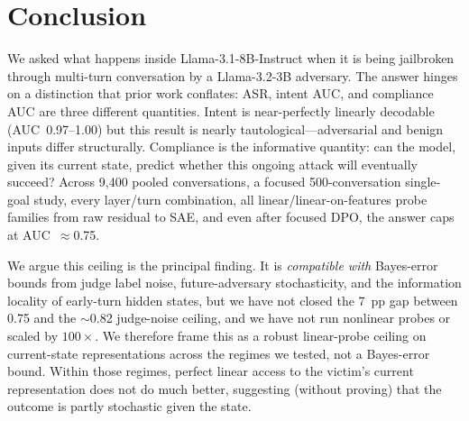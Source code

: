\documentclass[11pt]{article}
\begin{document}
\section{Conclusion}

We asked what happens inside Llama-3.1-8B-Instruct when it is being jailbroken through multi-turn conversation by a Llama-3.2-3B adversary.
The answer hinges on a distinction that prior work conflates: ASR, intent AUC, and compliance AUC are three different quantities.
Intent is near-perfectly linearly decodable (AUC~0.97--1.00) but this result is nearly tautological---adversarial and benign inputs differ structurally.
Compliance is the informative quantity: can the model, given its current state, predict whether this ongoing attack will eventually succeed?
Across 9{,}400 pooled conversations, a focused 500-conversation single-goal study, every layer/turn combination, all linear/linear-on-features probe families from raw residual to SAE, and even after focused DPO, the answer caps at AUC~$\approx$0.75.

We argue this ceiling is the principal finding.
It is \emph{compatible with} Bayes-error bounds from judge label noise, future-adversary stochasticity, and the information locality of early-turn hidden states, but we have not closed the 7~pp gap between 0.75 and the $\sim$0.82 judge-noise ceiling, and we have not run nonlinear probes or scaled by $100\times$.
We therefore frame this as a robust linear-probe ceiling on current-state representations across the regimes we tested, not a Bayes-error bound.
Within those regimes, perfect linear access to the victim's current representation does not do much better, suggesting (without proving) that the outcome is partly stochastic given the state.
\end{document}
